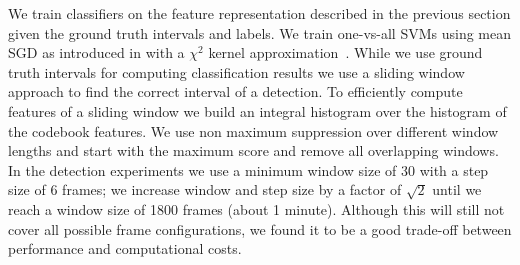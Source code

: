 

We train classifiers on the feature representation described in the previous section 
given the ground truth intervals and labels.
We train one-vs-all SVMs using mean SGD as introduced in  with a $\chi^2$ kernel approximation~\citep{vedaldi10cvpr}.
While we use ground truth intervals for computing classification results we use a sliding window approach to find the correct interval of a detection. To efficiently compute features of a sliding window we build an integral histogram over the histogram of the codebook features. We use non maximum suppression over different window lengths and start with the maximum score and remove all overlapping windows.
%
%
In the detection experiments we use a minimum window size of 30 with a step size of 6 frames; we increase window and step size by a factor of $\sqrt{2}$ until we reach a window size of 1800 frames (about 1 minute). Although this will still not cover all possible frame configurations, we found it to be a good trade-off between performance and computational costs.


% 
% 
% 






